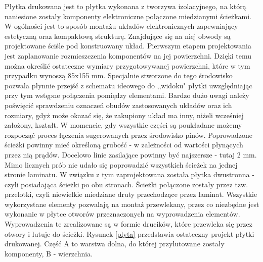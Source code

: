 Płytka drukowana jest to płytka wykonana z tworzywa izolacyjnego, na którą naniesione zostały komponenty elektroniczne połączone miedzianymi ścieżkami. W ogólności jest to sposób montażu układów elektronicznych zapewniający estetyczną oraz kompaktową strukturę. Znajdujące się na niej obwody są projektowane ściśle pod konstruowany układ.
Pierwszym etapem projektowania jest zaplanowanie rozmieszczenia komponentów na jej powierzchni. Dzięki temu można określić ostateczne wymiary przygotowywanej powierzchni, które w tym przypadku wynoszą 85x155 mm. Specjalnie stworzone do tego środowisko pozwala płynnie przejść z schematu ideowego do ,,widoku" płytki uwzględniając przy tym wstępne połączenia pomiędzy elementami. Bardzo dużo uwagi należy poświęcić sprawdzeniu oznaczeń obudów zastosowanych układów oraz ich rozmiary, gdyż może okazać się, że zakupiony układ ma inny, niżeli wcześniej założony, kształt. W momencie, gdy wszystkie części są poukładane możemy rozpocząć proces łączenia sugerowanych przez środowisko pinów. Poprowadzone ścieżki powinny mieć określoną grubość - w zależności od wartości płynących przez nią prądów. Docelowo linie zasilające powinny być najszersze - tutaj 2 mm. Mimo licznych prób nie udało się poprowadzić wszystkich ścieżek na jednej stronie laminatu. W związku z tym zaprojektowana została płytka dwustronna - czyli posiadająca ścieżki po obu stronach. Ścieżki połączone zostały przez tzw. przelotki, czyli niewielkie miedziane druty przechodzące przez laminat. Wszystkie wykorzystane elementy pozwalają na montaż przewlekany, przez co niezbędne jest wykonanie w płytce otworów przeznaczonych na wyprowadzenia elementów. Wyprowadzenia te zrealizowane są w formie drucików, które przewleka się przez otwory i lutuje do ścieżki. Rysunek \ref{plyta} przedstawia ostateczny projekt płytki drukowanej. Część A to warstwa dolna, do której przylutowane zostały komponenty, B - wierzchnia.
\newpage
